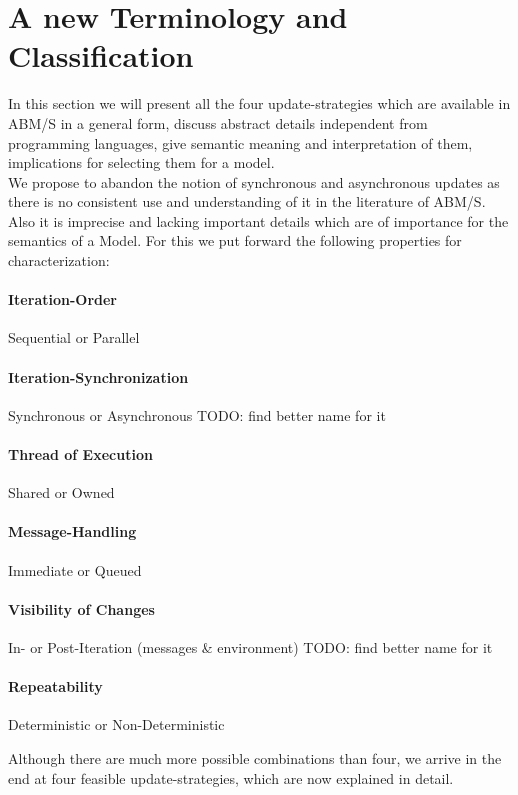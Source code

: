 \section{A new Terminology and Classification}
In this section we will present all the four update-strategies which are available in ABM/S in a general form, discuss abstract details independent from programming languages, give semantic meaning and interpretation of them, implications for selecting them for a model. \\
We propose to abandon the notion of synchronous and asynchronous updates as there is no consistent use and understanding of it in the literature of ABM/S. Also it is imprecise and lacking important details which are of importance for the semantics of a Model. For this we put forward the following properties for characterization: 

\paragraph{Iteration-Order}
Sequential or Parallel

\paragraph{Iteration-Synchronization}
Synchronous or Asynchronous
TODO: find better name for it

\paragraph{Thread of Execution}
Shared or Owned

\paragraph{Message-Handling}
Immediate or Queued

\paragraph{Visibility of Changes}
In- or Post-Iteration
(messages \& environment)
TODO: find better name for it

\paragraph{Repeatability}
Deterministic or Non-Deterministic


Although there are much more possible combinations than four, we arrive in the end at four feasible update-strategies, which are now explained in detail.

